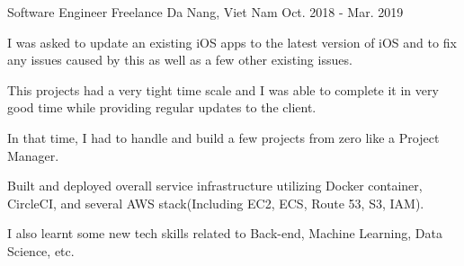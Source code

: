 \begin{cventries}
  \cventry
    {Software Engineer} %
    {Freelance} %
    {Da Nang, Viet Nam} %
    {Oct. 2018 - Mar. 2019} %
    {
      \begin{cvitems} %
        \item {I was asked to update an existing iOS apps to the latest version of iOS and to fix any issues caused by this as well as a few other existing issues.}
        \item {This projects had a very tight time scale and I was able to complete it in very good time while providing regular updates to the client.}
        \item {In that time, I had to handle and build a few projects from zero like a Project Manager.}
        \item {Built and deployed overall service infrastructure utilizing Docker container, CircleCI, and several AWS stack(Including EC2, ECS, Route 53, S3, IAM).}
        \item {I also learnt some new tech skills related to Back-end, Machine Learning, Data Science, etc.}
      \end{cvitems}
    }


\end{cventries}
